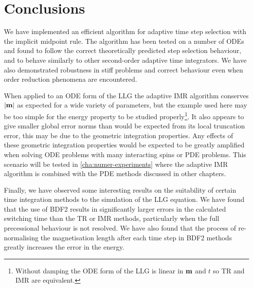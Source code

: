 \section{Conclusions}

We have implemented an efficient algorithm for adaptive time step selection with the implicit midpoint rule.
The algorithm has been tested on a number of ODEs and found to follow the correct theoretically predicted step selection behaviour, and to behave similarly to other second-order adaptive time integrators.
We have also demonstrated robustness in stiff problems and correct behaviour even when order reduction phenomena are encountered.

When applied to an ODE form of the LLG the adaptive IMR algorithm conserves $\left|{\boldsymbol{\mathrm{m}}} \right|$ as expected for a wide variety of parameters, but the example used here may be too simple for the energy property to be studied properly\footnote{Without damping the ODE form of the LLG is linear in $\boldsymbol{\mathrm{m}}$ and $t$ so TR and IMR are equivalent.}.
It also appears to give smaller global error norms than would be expected from its local truncation error, this may be due to the geometric integration properties.
Any effects of these geometric integration properties would be expected to be greatly amplified when solving ODE problems with many interacting spins or PDE problems.
This scenario will be tested in \cref{cha:numer-experiments} where the adaptive IMR algorithm is combined with the PDE methods discussed in other chapters.

Finally, we have observed some interesting results on the suitability of certain time integration methods to the simulation of the LLG equation.
We have found that the use of BDF2 results in significantly larger errors in the calculated switching time than the TR or IMR methods, particularly when the full precessional behaviour is not resolved.
We have also found that the process of re-normalising the magnetisation length after each time step in BDF2 methods greatly increases the error in the energy.


